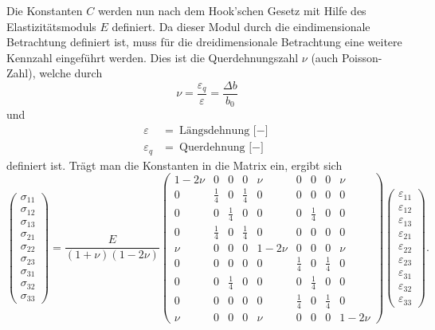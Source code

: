 Die Konstanten $C$ werden nun nach dem Hook'schen Gesetz mit Hilfe des Elastizitätsmoduls $E$ definiert.
Da dieser Modul durch die eindimensionale Betrachtung definiert ist,
muss für die dreidimensionale Betrachtung eine weitere Kennzahl eingeführt werden.
Dies ist die Querdehnungszahl $\nu$ (auch Poisson-Zahl), welche durch
%
%
\[
\nu
=
\frac{\varepsilon_q}{\varepsilon}
=
\frac{\Delta b}{b_0}
\]
und
\begin{align*}
	\varepsilon     &= \text{Längsdehnung [$-$]} \\
	\varepsilon_q   &= \text{Querdehnung [$-$]}
\end{align*}
definiert ist. Trägt man die Konstanten in die Matrix ein, ergibt sich
\[
\begin{pmatrix}
	\sigma_{11}\\
	\sigma_{12}\\
	\sigma_{13}\\
	\sigma_{21}\\
	\sigma_{22}\\
	\sigma_{23}\\
	\sigma_{31}\\
	\sigma_{32}\\
	\sigma_{33}
\end{pmatrix}
=
\frac{E}{(1+\nu)(1-2\nu)}
\begin{pmatrix}
	1-2\nu &          0 &          0 &          0 &    \nu &          0 &          0 &          0 & \nu   \\
	     0 &\frac{1}{4} &          0 &\frac{1}{4} &      0 &          0 &          0 &          0 & 0     \\
	     0 &          0 &\frac{1}{4} &          0 &      0 &          0 &\frac{1}{4} &          0 & 0     \\
	     0 &\frac{1}{4} &          0 &\frac{1}{4} &      0 &          0 &          0 &          0 & 0     \\
	   \nu &          0 &          0 &          0 & 1-2\nu &          0 &          0 &          0 & \nu   \\
  	     0 &          0 &          0 &          0 &      0 &\frac{1}{4} &          0 &\frac{1}{4} & 0     \\
	     0 &          0 &\frac{1}{4} &          0 &      0 &          0 &\frac{1}{4} &          0 & 0     \\
	     0 &          0 &          0 &          0 &      0 &\frac{1}{4} &          0 &\frac{1}{4} & 0     \\
	   \nu &          0 &          0 &          0 &    \nu &          0 &          0 &          0 & 1-2\nu
\end{pmatrix}
\begin{pmatrix}
	\varepsilon_{11} \\
	\varepsilon_{12} \\
	\varepsilon_{13} \\
	\varepsilon_{21} \\
	\varepsilon_{22} \\
	\varepsilon_{23} \\
	\varepsilon_{31} \\
	\varepsilon_{32} \\
	\varepsilon_{33}
\end{pmatrix}
.
\]
